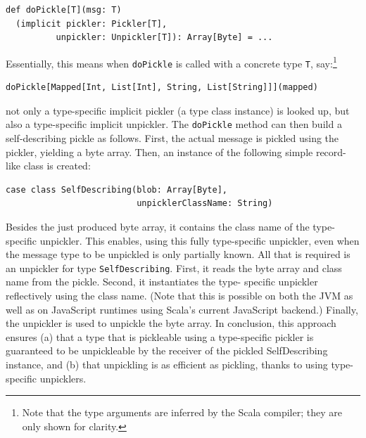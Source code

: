 \documentclass{jfp1}
\begin{document}
{\begin{lstlisting}
def doPickle[T](msg: T)
  (implicit pickler: Pickler[T],
          unpickler: Unpickler[T]): Array[Byte] = ...
\end{lstlisting}

Essentially, this means when \verb|doPickle| is called with a concrete type
\verb|T|, say:\footnote{Note that the type arguments are inferred by the Scala
compiler; they are only shown for clarity.}

\begin{lstlisting}
doPickle[Mapped[Int, List[Int], String, List[String]]](mapped)
\end{lstlisting}

\noindent not only a type-specific implicit pickler (a type class instance) is
looked up, but also a type-specific implicit unpickler. The \verb|doPickle|
method can then build a self-describing pickle as follows. First, the actual
message is pickled using the pickler, yielding a byte array. Then, an instance
of the following simple record-like class is created:

\begin{lstlisting}
case class SelfDescribing(blob: Array[Byte],
                          unpicklerClassName: String)
\end{lstlisting}

Besides the just produced byte array, it contains the class name of the type-
specific unpickler. This enables, using this fully type-specific unpickler, even
when the message type to be unpickled is only partially known. All that is
required is an unpickler for type \verb|SelfDescribing|. First, it reads the
byte array and class name from the pickle. Second, it instantiates the type-
specific unpickler reflectively using the class name. (Note that this is
possible on both the JVM as well as on JavaScript runtimes using Scala's current
JavaScript backend.) Finally, the unpickler is used to unpickle the byte array.
In conclusion, this approach ensures (a) that a type that is pickleable using a
type-specific pickler is guaranteed to be unpickleable by the receiver of the
pickled SelfDescribing instance, and (b) that unpickling is as efficient as
pickling, thanks to using type-specific unpicklers.
}

\end{document}
